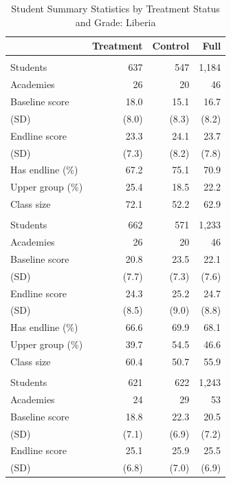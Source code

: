 \begin{table}[htbp]
\caption{Student Summary Statistics by Treatment Status and Grade: Liberia}
\label{tab:lib_sumstats}
\begin{center}
\begin{small}
\begin{threeparttable}
\renewcommand{\arraystretch}{0.95}
\begin{tabular}{l*{3}{r}}
\toprule
 & Treatment & Control & Full \\
\midrule
\addlinespace
\multicolumn{4}{l}{\textit{Grade 1}} \\
Students & 637 & 547 & 1,184 \\
Academies & 26 & 20 & 46 \\
Baseline score & 18.0 & 15.1 & 16.7 \\
\quad (SD) & (8.0) & (8.3) & (8.2) \\
Endline score & 23.3 & 24.1 & 23.7 \\
\quad (SD) & (7.3) & (8.2) & (7.8) \\
Has endline (\%) & 67.2 & 75.1 & 70.9 \\
Upper group (\%) & 25.4 & 18.5 & 22.2 \\
Class size & 72.1 & 52.2 & 62.9 \\
\addlinespace
\multicolumn{4}{l}{\textit{Grade 2}} \\
Students & 662 & 571 & 1,233 \\
Academies & 26 & 20 & 46 \\
Baseline score & 20.8 & 23.5 & 22.1 \\
\quad (SD) & (7.7) & (7.3) & (7.6) \\
Endline score & 24.3 & 25.2 & 24.7 \\
\quad (SD) & (8.5) & (9.0) & (8.8) \\
Has endline (\%) & 66.6 & 69.9 & 68.1 \\
Upper group (\%) & 39.7 & 54.5 & 46.6 \\
Class size & 60.4 & 50.7 & 55.9 \\
\addlinespace
\multicolumn{4}{l}{\textit{Grade 3}} \\
Students & 621 & 622 & 1,243 \\
Academies & 24 & 29 & 53 \\
Baseline score & 18.8 & 22.3 & 20.5 \\
\quad (SD) & (7.1) & (6.9) & (7.2) \\
Endline score & 25.1 & 25.9 & 25.5 \\
\quad (SD) & (6.8) & (7.0) & (6.9) \\

\end{tabular}
\end{threeparttable}
\end{small}
\end{center}
\end{table}
